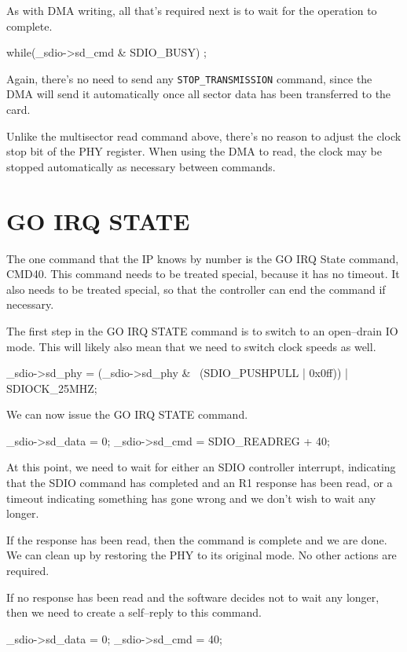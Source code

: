 \documentclass{gqtekspec}
\begin{document}
As with DMA writing, all that's required next is to wait for the operation to
complete.

\begin{zCpp}
	while(_sdio->sd_cmd & SDIO_BUSY)
		;
\end{zCpp}

Again, there's no need to send any {\tt STOP\_TRANSMISSION} command, since the
DMA will send it automatically once all sector data has been transferred to the
card. 

Unlike the multisector read command above, there's no reason to adjust the
clock stop bit of the PHY register.  When using the DMA to read, the clock
may be stopped automatically as necessary between commands.
\section{GO IRQ STATE}
The one command that the IP knows by number is the GO IRQ State command,
CMD40.  This command needs to be treated special, because it has no timeout.
It also needs to be treated special, so that the controller can end the
command if necessary.

The first step in the GO IRQ STATE command is to switch to an open--drain
IO mode.  This will likely also mean that we need to switch clock speeds
as well.

\begin{zCpp}
	_sdio->sd_phy = (_sdio->sd_phy & ~(SDIO_PUSHPULL | 0x0ff))
			| SDIOCK_25MHZ;
\end{zCpp}

We can now issue the GO IRQ STATE command.

\begin{zCpp}
	_sdio->sd_data = 0;
	_sdio->sd_cmd  = SDIO_READREG + 40;
\end{zCpp}

At this point, we need to wait for either an SDIO controller interrupt,
indicating that the SDIO command has completed and an R1 response has been
read, or a timeout indicating something has gone wrong and we don't wish to
wait any longer.

If the response has been read, then the command is complete and we are done.
We can clean up by restoring the PHY to its original mode.  No other actions
are required.

If no response has been read and the software decides not to wait any longer,
then we need to create a self--reply to this command.

\begin{zCpp}
	_sdio->sd_data = 0;
	_sdio->sd_cmd  = 40;
\end{zCpp}
\end{document}
